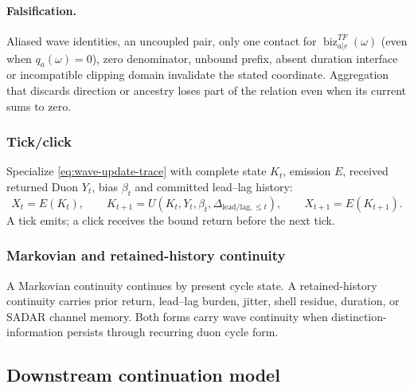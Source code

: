 \paragraph{Falsification.}
Aliased wave identities, an uncoupled pair, only one contact for
\(\operatorname{biz}^{TF}_{a|r}(\omega)\) (even when \(q_a(\omega)=0\)), zero
denominator, unbound prefix, absent duration interface or incompatible clipping
domain invalidate the stated coordinate. Aggregation that discards direction or
ancestry loses part of the relation even when its current sums to zero.


\subsubsection{Tick/click}
\label{subsec:duon-tick-click}
Specialize \eqref{eq:wave-update-trace} with complete state \(K_t\),
emission \(E\), received returned Duon \(Y_t\), bias \(\beta_t\) and committed
lead--lag history:
\[
X_t=E(K_t),\qquad
K_{t+1}=U(K_t,Y_t,\beta_t,\Delta_{\mathrm{lead/lag},\le t}),\qquad
X_{t+1}=E(K_{t+1}).
\]
A tick emits; a click receives the bound return before the next tick.

\subsubsection{Markovian and retained-history continuity}
\label{subsec:duon-continuity}
A Markovian continuity continues by present cycle state. A retained-history continuity carries prior return, lead--lag burden, jitter, shell residue, duration, or SADAR channel memory. Both forms carry wave continuity when distinction-information persists through recurring duon cycle form.


\subsection{Downstream continuation model}
\label{subsec:q4-hamming-ternary-kernel}
\label{subsec:hinge-slide}
